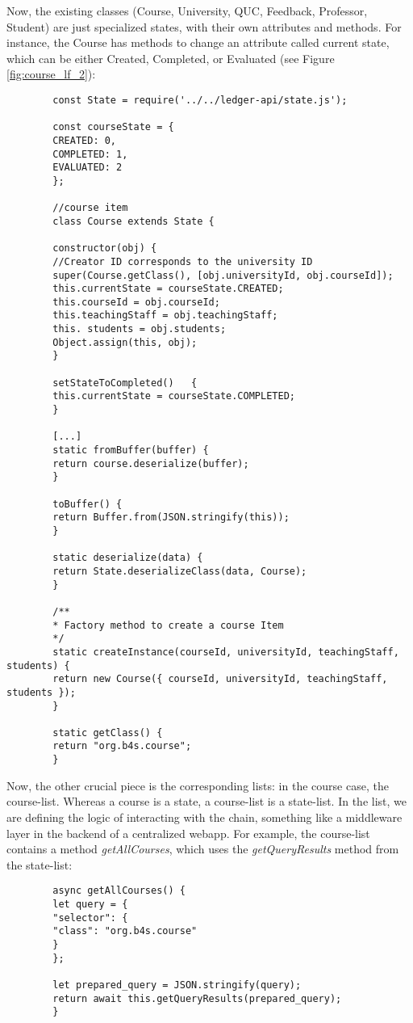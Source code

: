\documentclass[12pt,a4paper]{article}
\theoremstyle{definition}
\begin{document}
    Now, the existing classes (Course, University, QUC, Feedback, Professor, Student) are just specialized states, with their own attributes and methods. For instance, the Course has methods to change an attribute called current state, which can be either Created, Completed, or Evaluated (see Figure \ref{fig:course_lf_2}):
    \begin{verbatim}
        const State = require('../../ledger-api/state.js');

        const courseState = {
        CREATED: 0,
        COMPLETED: 1,
        EVALUATED: 2
        };

        //course item
        class Course extends State {

        constructor(obj) {
        //Creator ID corresponds to the university ID
        super(Course.getClass(), [obj.universityId, obj.courseId]);
        this.currentState = courseState.CREATED;
        this.courseId = obj.courseId;
        this.teachingStaff = obj.teachingStaff;
        this. students = obj.students;
        Object.assign(this, obj);
        }

        setStateToCompleted()   {
        this.currentState = courseState.COMPLETED;
        }

        [...]
        static fromBuffer(buffer) {
        return course.deserialize(buffer);
        }

        toBuffer() {
        return Buffer.from(JSON.stringify(this));
        }

        static deserialize(data) {
        return State.deserializeClass(data, Course);
        }

        /**
        * Factory method to create a course Item
        */
        static createInstance(courseId, universityId, teachingStaff, students) {
        return new Course({ courseId, universityId, teachingStaff, students });
        }

        static getClass() {
        return "org.b4s.course";
        }

    \end{verbatim}

    Now, the other crucial piece is the corresponding lists: in the course case, the course-list. Whereas a course is a state, a course-list is a state-list. In the list, we are defining the logic of interacting with the chain, something like a middleware layer in the backend of a centralized webapp. For example, the course-list contains a method \emph{getAllCourses}, which uses the \emph{getQueryResults} method from the state-list:
    \begin{verbatim}
        async getAllCourses() {
        let query = {
        "selector": {
        "class": "org.b4s.course"
        }
        };

        let prepared_query = JSON.stringify(query);
        return await this.getQueryResults(prepared_query);
        }

    \end{verbatim}
\end{document}
